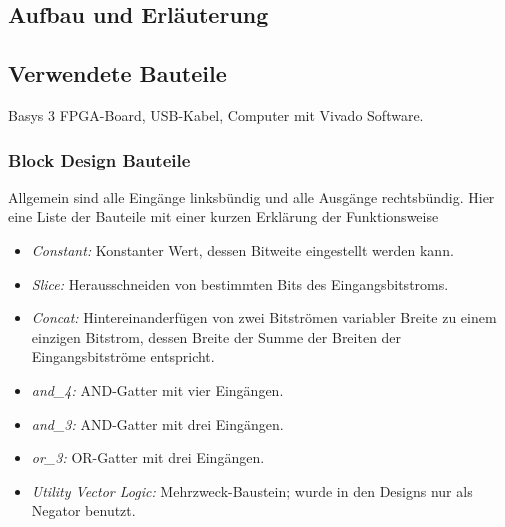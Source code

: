\documentclass[11pt, a4paper]{article}
\begin{document}
\subsection*{Aufbau und Erläuterung}
\subsection*{Verwendete Bauteile}
Basys 3 FPGA-Board, USB-Kabel, Computer mit Vivado Software.
\subsubsection*{Block Design Bauteile}
Allgemein sind alle Eingänge linksbündig und alle Ausgänge rechtsbündig.
Hier eine Liste der Bauteile mit einer kurzen Erklärung der Funktionsweise
\begin{itemize}	
	\item \textit{Constant:} Konstanter Wert, dessen Bitweite eingestellt werden kann.
	\item \textit{Slice:} Herausschneiden von bestimmten Bits des Eingangsbitstroms.
	\item \textit{Concat:} Hintereinanderfügen von zwei Bitströmen variabler Breite zu einem einzigen Bitstrom, dessen Breite der Summe der Breiten der Eingangsbitströme entspricht.
	\item \textit{and\_4:} AND-Gatter mit vier Eingängen.
	\item \textit{and\_3:} AND-Gatter mit drei Eingängen.
	\item \textit{or\_3:} OR-Gatter mit drei Eingängen.
	\item \textit{Utility Vector Logic:} Mehrzweck-Baustein; wurde in den Designs nur als Negator benutzt.
\end{itemize}

\newpage
\end{document}
